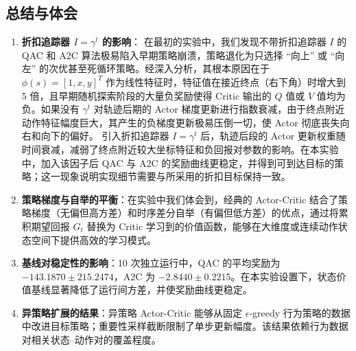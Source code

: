 \documentclass[11pt,a4paper,UTF8]{ctexart}
\numberwithin{figure}{section}
\numberwithin{table}{section}
\begin{document}
\subsection{总结与体会}

\begin{enumerate}
\item \textbf{折扣追踪器 $I = \gamma^t$ 的影响}：
   在最初的实验中，我们发现不带折扣追踪器 $I$ 的 QAC 和 A2C 算法极易陷入早期策略崩溃，策略退化为只选择 “向上” 或 “向左” 的次优甚至死循环策略。经深入分析，其根本原因在于 $\phi(s) = [1, x, y]^T$ 作为线性特征时，特征值在接近终点（右下角）时增大到 5 倍，且早期随机探索阶段的大量负奖励使得 Critic 输出的 $Q$ 值或 $V$ 值均为负。如果没有 $\gamma^t$ 对轨迹后期的 Actor 梯度更新进行指数衰减，由于终点附近动作特征幅度巨大，其产生的负梯度更新极易压倒一切，使 Actor 彻底丧失向右和向下的偏好。
   引入折扣追踪器 $I=\gamma^t$ 后，轨迹后段的 Actor 更新权重随时间衰减，减弱了终点附近较大坐标特征和负回报对参数的影响。在本实验中，加入该因子后 QAC 与 A2C 的奖励曲线更稳定，并得到可到达目标的策略；这一现象说明实现细节需要与所采用的折扣目标保持一致。
\item \textbf{策略梯度与自举的平衡}：在实验中我们体会到，经典的 Actor-Critic 结合了策略梯度（无偏但高方差）和时序差分自举（有偏但低方差）的优点，通过将累积期望回报 $G_t$ 替换为 Critic 学习到的价值函数，能够在大维度或连续动作状态空间下提供高效的学习模式。
\item \textbf{基线对稳定性的影响}：10 次独立运行中，QAC 的平均奖励为 $-143.1870\pm215.2474$，A2C 为 $-2.8440\pm0.2215$。在本实验设置下，状态价值基线显著降低了运行间方差，并使奖励曲线更稳定。
\item \textbf{异策略扩展的结果}：异策略 Actor-Critic 能够从固定 $\epsilon$-greedy 行为策略的数据中改进目标策略；重要性采样截断限制了单步更新幅度。该结果依赖行为数据对相关状态--动作对的覆盖程度。
\end{enumerate}
\end{document}
